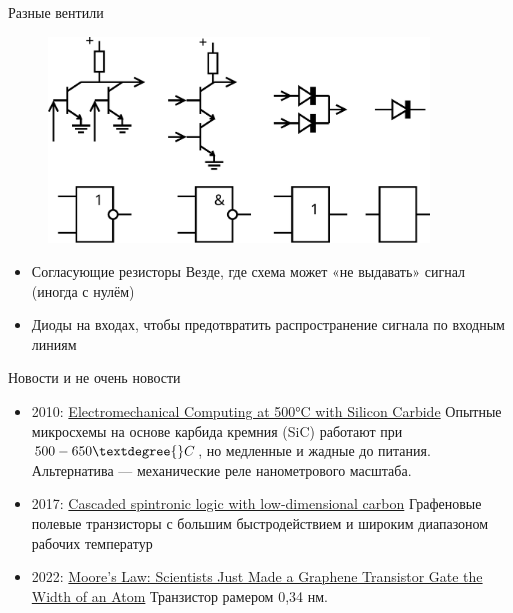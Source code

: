 \documentclass[xetex,aspectratio=43]{beamer}
\begin{document}
\begin{frame}{Разные вентили}
    \begin{figure}
    \includegraphics[width=0.9\textwidth]{img/07.transistor-gates.pdf}
    \end{figure}

    \begin{itemize}
    \tightlist
    \item
      Согласующие резисторы Везде, где схема может «не выдавать» сигнал
      (иногда с нулём)
    \item
      Диоды на входах, чтобы предотвратить распространение сигнала по
      входным линиям
    \end{itemize}
\end{frame}

\begin{frame}{Новости и не очень новости}
\begin{itemize}
\item
  2010: \href{https://www.science.org/doi/abs/10.1126/science.1192511}{Electromechanical Computing at 500°C with Silicon Carbide}
  Опытные микросхемы на основе карбида кремния (SiC)
  работают при $500-650 \textdegree{}C$, но медленные и жадные до питания.
  Альтернатива --- механические реле нанометрового масштаба.
\item
  2017: \href{https://www.nature.com/articles/ncomms15635}{Cascaded spintronic logic with low-dimensional carbon}
  Графеновые полевые транзисторы с большим быстродействием и широким диапазоном рабочих температур
\item
  2022: \href{https://singularityhub.com/2022/03/13/moores-law-scientists-just-made-a-graphene-transistor-gate-the-width-of-an-atom/}{Moore’s Law: Scientists Just Made a Graphene Transistor Gate the Width of an Atom}
  Транзистор рамером 0,34 нм.
\end{itemize}

\end{frame}
\end{document}
